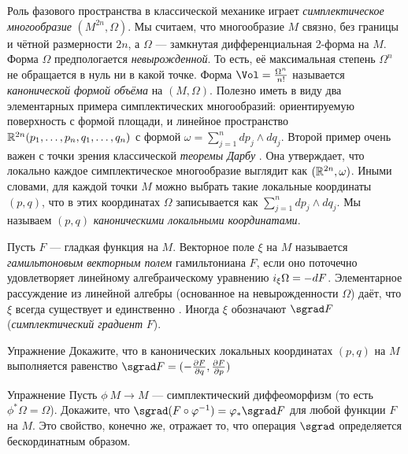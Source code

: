 Роль фазового пространства в классической механике играет \emph{симплектическое многообразие} $(M^{2n},\Omega)$.
Мы считаем, что многообразие $M$ связно, без границы и чётной размерности $2n$, а $\Omega$ — замкнутая дифференциальная 2-форма на $M$.
Форма $\Omega$ предпологается {}\emph{невырожденной}.
То есть, её максимальная степень $\Omega^n$ не обращается в нуль ни в какой точке.
Форма $\Vol =  \tfrac{\Omega^n}{n!}$ называется \emph{канонической формой объёма} на $(M, \Omega)$.
Полезно иметь в виду два элементарных примера симплектических многообразий:
ориентируемую поверхность с формой площади, и линейное пространство $\RR^{2n} (p_1,\z\dots, p_n, q_1,\z\dots, q_n)$ с формой $\omega = \sum^n_{j = 1} dp_j \wedge dq_j$.
Второй пример очень важен с точки зрения классической \emph{теоремы Дарбу} \cite{MS}.
Она утверждает, что локально каждое симплектическое многообразие выглядит как $(\mathbb{R}^{2n}, \omega)$.
Иными словами, для каждой точки $M$ можно выбрать такие локальные координаты $(p, q)$, что в этих координатах $\Omega$ записывается как $\sum^n_{j = 1} dp_j \wedge dq_j$.
Мы называем $(p, q)$ \emph{каноническими локальными координатами}.

Пусть $F$ — гладкая функция на $M$.
Векторное поле $\xi$ на $M$ называется \emph{гамильтоновым векторным полем} гамильтониана $F$, если оно поточечно удовлетворяет линейному алгебраическому уравнению $i_\xi \Omega \z= -dF$.
Элементарное рассуждение из линейной алгебры (основанное на невырожденности $\Omega$) даёт, что $\xi$ всегда существует и единственно \cite{MS}.
Иногда $\xi$ обозначают $\sgrad F$ (\emph{симплектический градиент} $F$).

\begin{ex}{Упражнение}\label{1.3.A}
Докажите, что в канонических локальных координатах $(p, q)$ на
$M$ выполняется равенство \index[symb]{$\sgrad$} $\sgrad F = (-\tfrac{\partial F}{\partial q},\tfrac{\partial F}{\partial p})$
\end{ex}

\begin{ex}{Упражнение}\label{1.3.B}
Пусть  $\phi\: M \to M$ — симплектический диффеоморфизм
(то есть $\phi^\ast \Omega = \Omega$).
Докажите, что $\sgrad (F \circ \phi^{-1}) \z= \phi_\ast \sgrad F$ для любой функции $F$ на $M$.
Это свойство, конечно же, отражает то, что операция $\sgrad$ определяется бескординатным образом.
\end{ex}


